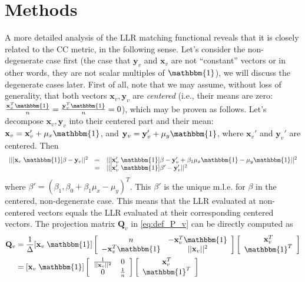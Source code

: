 \vspace{-0.5cm}
\section{Methods}
A more detailed analysis of the LLR matching functional reveals that it is closely related to the CC metric, in the following sense. Let's consider the non-degenerate case first (the case that $\mathbf{y}_{v}$ and $\mathbf{x}_{v}$ are not ``constant'' vectors or in other words, they are not scalar multiples of $\mathbbm{1}$), we will discuss the degenerate cases later. First of all, note that we may assume, without loss of generality, that both vectors $\mathbf{x}_{v}, \mathbf{y}_{v}$ are \emph{centered} (i.e., their means are zero: $\frac{\mathbf{x}_{v}^{T}\mathbbm{1}}{n} = \frac{\mathbf{y}_{v}^{T}\mathbbm{1}}{n} = 0$), which may be proven as follows. Let's decompose $\mathbf{x}_{v}, \mathbf{y}_{v}$ into their centered part and their mean: $\mathbf{x}_{v} = \mathbf{x}_{v}' + \mu_{x}\mathbbm{1}$, and $\mathbf{y}_{v} = \mathbf{y}_{v}' + \mu_{y}\mathbbm{1}$, where $\mathbf{x}_{v}'$ and $\mathbf{y}_{v}'$ are centered. Then
\begin{displaymath}
    \begin{array}{lcl}
        ||[\mathbf{x}_{v} \; \mathbbm{1}]\beta - \mathbf{y}_{v}||^{2} &=& ||[\mathbf{x}_{v}' \; \mathbbm{1}]\beta - \mathbf{y}_{v}' + \beta_{1}\mu_{x}\mathbbm{1} - \mu_{y}\mathbbm{1}||^{2}\\
        &=&||[\mathbf{x}_{v}' \; \mathbbm{1}]\beta' - \mathbf{y}_{v}'||^{2}
    \end{array}
\end{displaymath}
where $\beta' = (\beta_{1}, \beta_{0} + \beta_{1}\mu_{x} - \mu_{y})^{T}$. This $\beta'$ is the unique m.l.e. for $\beta$ in the centered, non-degenerate case. This means that the LLR evaluated at non-centered vectors equals the LLR evaluated at their corresponding centered vectors. The projection matrix $\mathbf{Q}_{v}$ in \eqref{eq:def_P_v} can be directly computed as
\begin{align*}
    \mathbf{Q}_{v} &= \frac{1}{\Delta}
    [\mathbf{x}_{v} \; \mathbbm{1}]
    \left[\begin{array}{cc}
        n & - \mathbf{x}_{v}^{T}\mathbbm{1}\\
        -\mathbf{x}_{v}^{T}\mathbbm{1} & ||\mathbf{x}_{v}||^{2}
    \end{array}\right]
    \left[\begin{array}{c}
        \mathbf{x}_{v}^{T}\\
        \mathbbm{1}^{T}
    \end{array}\right] \\
    &= [\mathbf{x}_{v} \; \mathbbm{1}]
    \left[\begin{array}{cc}
        \frac{1}{||\mathbf{x}_{v}||^{2}} & 0\\
        0 & \frac{1}{n}
    \end{array}\right]
    \left[\begin{array}{c}
        \mathbf{x}_{v}^{T}\\
        \mathbbm{1}^{T}
    \end{array}\right]
\end{align*}
